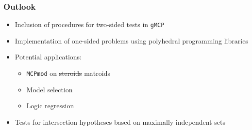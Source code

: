 \documentclass[bigger]{beamer}
\newcommand{\parentd}{../}
\begin{document}
\begin{frame}
\frametitle{Outlook}
\begin{itemize}
\item Inclusion of procedures for two-sided tests in \texttt{gMCP} 
\item Implementation of one-sided problems using polyhedral
  programming libraries
\item Potential applications:
  \begin{itemize}
  \item \texttt{MCPmod} on \sout{steroids} matroids
  \item Model selection
  \item Logic regression
  \end{itemize}
\item Tests for intersection hypotheses based on maximally independent
  sets 
\end{itemize}
\end{frame}



\end{document}
